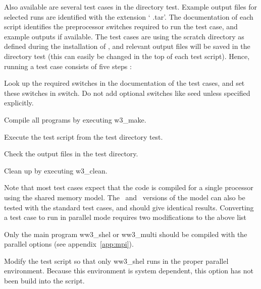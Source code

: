 Also available are several test cases in the directory {\dir test}. Example
output files for selected runs are identified with the extension `{\file
.tar}'. The documentation of each script identifies the preprocessor switches
required to run the test case, and example outputs if available. The test
cases are using the scratch directory as defined during the installation of
\ws, and relevant output files will be saved in the directory {\dir test}
(this can easily be changed in the top of each test script). Hence, running a
test case consists of five steps :

\begin{list}{)\hfill}
            { \leftmargin 15mm 
             \rightmargin 5mm \itemsep 0mm \parsep 0mm}
\item Look up the required switches in the documentation of the
      test cases, and set these switches in {\file switch}. Do not
      add optional switches like {\F seed} unless specified
      explicitly.
\item Compile all programs by executing {\file w3\_make}.
\item Execute the test script from the test directory {\dir test}.
\item Check the output files in the test directory.
\item Clean up by executing {\file w3\_clean}.
\end{list}

\noindent
Note that most test cases expect that the code is compiled for a single
processor using the shared memory model. The \omp\ and \mpi\ versions of the
model can also be tested with the standard test cases, and should give
identical results. Converting a test case to run in parallel mode requires two
modifications to the above list

\begin{list}{)\hfill}
            { \leftmargin 15mm 
             \rightmargin 5mm \itemsep 0mm \parsep 0mm}
\item Only the main program {\file ww3\_shel} or {\file ww3\_multi} should be
      compiled with the parallel options (see appendix~\ref{app:mpi}).
\item Modify the test script so that only {\file ww3\_shel} runs in the
      proper parallel environment. Because this environment is system
      dependent, this option has not been build into the script.
\end{list}


\bpage
